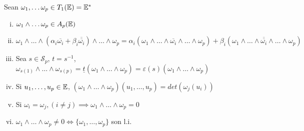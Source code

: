 \begin{prop} \label{prop_pr_ext}
    Sean $\omega_1, \dots \omega_p \in T_1(\mathbb{E}) = \mathbb{E}^*$
    \begin{enumerate}[i)]
        \item $\omega_1 \wedge \dots \omega_p \in A_p(\mathbb{E})$
        \item $\omega_1 \wedge \dots \wedge \left(\alpha_i \overline{\omega_i} + \beta_i \overline{\overline{\omega_i}} \right)
        \wedge \dots \wedge \omega_p = \alpha_i (\omega_1 \wedge \dots \wedge \overline{\omega_i} \wedge \dots
        \wedge \omega_p) + \beta_i (\omega_1 \wedge \dots \wedge \overline{\overline{\omega_i}} \wedge \dots
        \wedge \omega_p)$
        \item Sea $s \in \mathcal{S}_p$, $t = s^{-1}$, $\omega_{s(1)} \wedge \dots \wedge \omega_{s(p)} =
        \underline{t}\left(\omega_1 \wedge \dots \wedge \omega_p \right) = \varepsilon(s)\left( \omega_1
        \wedge \dots \wedge \omega_p \right)$
        \item Si $u_1, \dots, u_p \in \mathbb{E}$, $\left( \omega_1 \wedge \dots \wedge \omega_p\right) \left(u_1, \dots,
        u_p\right) = det\left(\omega_j(u_i)\right)$
        \item Si $\omega_i = \omega_j , (i \neq j) \implies \omega_1 \wedge \dots \wedge \omega_p = 0$
        \item $\omega_1 \wedge \dots \wedge \omega_p \neq 0 \iff \{\omega_1,\dots,\omega_p\}$ son l.i.
    \end{enumerate}
\end{prop}

